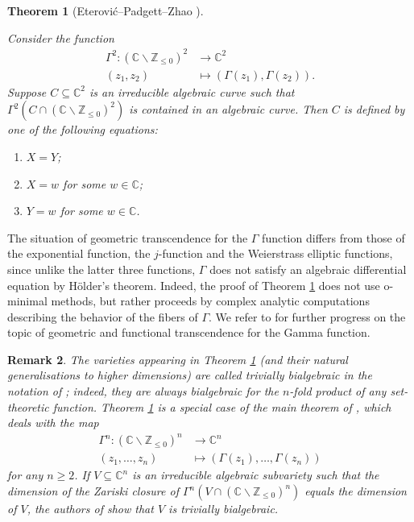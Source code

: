 \documentclass[11pt,reqno]{amsart}
\newtheorem{theorem}{Theorem}[section]
\newtheorem{remark}[theorem]{Remark}
\theoremstyle{definition}
\numberwithin{equation}{section}
\begin{document}
\begin{theorem}[Eterovi\'c--Padgett--Zhao \cite{EPZ25}] \label{complexgt}




Consider the function
\begin{align*}
\Gamma^2: (\mathbb C  \smallsetminus \mathbb Z_{\leq 0})^{2} & \longrightarrow \mathbb C^2 \\ 
(z_1, z_2) & \mapsto (\Gamma(z_1), \Gamma(z_2)).
\end{align*}
Suppose $C \subseteq \mathbb C^2$ is an irreducible algebraic curve such that $\Gamma^2(C \cap (\mathbb C\smallsetminus \mathbb Z_{\leq 0})^2)$ is contained in an algebraic curve. Then $C$ is defined by one of the following equations:
\begin{enumerate}
\item $X=Y$;
\item  $X=w$ for some $w \in \mathbb C$; 
\item $Y=w$ for some $w \in \mathbb C$. 
\end{enumerate}
\end{theorem}


The situation of geometric transcendence for the $\Gamma$ function differs from those of the exponential function, the $j$-function and the Weierstrass elliptic functions, since unlike the latter three functions, $\Gamma$ does not satisfy an algebraic differential equation by H\"older's theorem. Indeed, the proof of Theorem \ref{complexgt} does not use o-minimal methods, but rather proceeds by complex analytic computations describing the
behavior of the fibers of $\Gamma$. We refer to \cite{DVP25, EP25} for further progress on the topic of geometric and functional transcendence for the Gamma function. 



\begin{remark}
The varieties appearing in Theorem \ref{complexgt} (and their natural generalisations to higher dimensions) are called \textit{trivially bialgebraic}  in the notation of \cite{EPZ25}; indeed, they are always bialgebraic for the $n$-fold product of any set-theoretic function. Theorem \ref{complexgt} is a special case of the main theorem of \cite{EPZ25}, which deals with the map  
\begin{align*}
\Gamma^n: (\mathbb C  \smallsetminus \mathbb Z_{\leq 0})^{n} & \longrightarrow \mathbb C^n \\ 
(z_1, \ldots ,z_n) & \mapsto (\Gamma(z_1), \ldots,  \Gamma(z_n))
\end{align*}
for any $n \geq 2$. If $V \subseteq \mathbb C^n$ is an irreducible algebraic subvariety such that the dimension of the Zariski closure of $\Gamma^n(V \cap (\mathbb C  \smallsetminus \mathbb Z_{\leq 0})^{n})$ equals the dimension of $V$,  the authors of \cite{EPZ25} show that $V$ is trivially bialgebraic. 
\end{remark}
\end{document}
